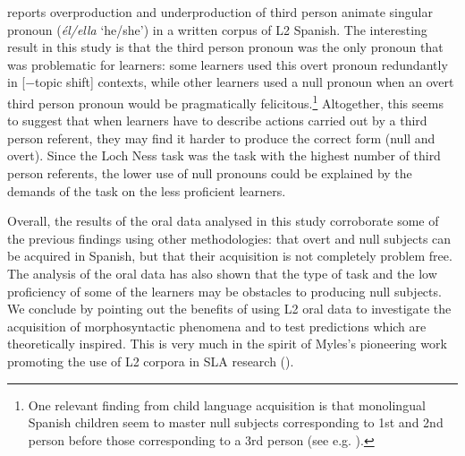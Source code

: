\documentclass[output=paper]{langscibook}
\begin{document}
\citet{Lozano2009} reports overproduction and underproduction of third person animate singular pronoun (\textit{él/ella} ‘he/she’) in a written corpus of L2 Spanish. The interesting result in this study is that the third person pronoun was the only pronoun that was problematic for learners: some learners used this overt pronoun redundantly in [−topic shift] contexts, while other learners used a null pronoun when an overt third person pronoun would be pragmatically felicitous.\footnote{One relevant finding from child language acquisition is that monolingual Spanish children seem to master null subjects corresponding to 1st and 2nd person before those corresponding to a 3rd person (see e.g. \citealt{ForsytheEtAl2021}).} Altogether, this seems to suggest that when learners have to describe actions carried out by a third person referent, they may find it harder to produce the correct form (null and overt). Since the Loch Ness task was the task with the highest number of third person referents, the lower use of null pronouns could be explained by the demands of the task on the less proficient learners.

Overall, the results of the oral data analysed in this study corroborate some of the previous findings using other methodologies: that overt and null subjects can be acquired in Spanish, but that their acquisition is not completely problem free. The analysis of the oral data has also shown that the type of task and the low proficiency of some of the learners may be obstacles to producing null subjects. We conclude by pointing out the benefits of using L2 oral data to investigate the acquisition of morphosyntactic phenomena and to test predictions which are theoretically inspired. This is very much in the spirit of Myles’s pioneering work promoting the use of L2 corpora in SLA research (\citealt{Myles2004,Myles2005,DominguezEtAl2013}).

\printbibliography[heading=subbibliography,notkeyword=this]
\end{document}
